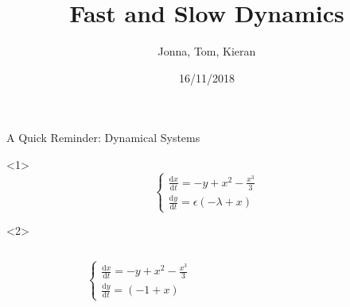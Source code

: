 \documentclass[11pt]{beamer}
\newcommand{\dif}{\mathrm{d}}
\newcommand{\vdp}{Van der Pol }
\begin{document}
  

\author{Jonna, Tom, Kieran}
\title{Fast and Slow Dynamics}
\date{16/11/2018} 
\frame \titlepage
%		


\begin{frame}{ A Quick Reminder: Dynamical Systems}
\begin{onlyenv}<1>
\huge
 \[\begin{cases}
 \frac{\dif x}{\dif t}= -y + x^2 - \frac{x^3}{3}\\
 \frac{\dif y}{\dif t}=\epsilon (-\lambda+x)
 \end{cases}\]%
\end{onlyenv}
\begin{onlyenv}<2>
\begin{columns}
\begin{figure}
    \centering
{}
\end{figure}
\[\begin{cases}
 \frac{\dif x}{\dif t}= -y + x^2 - \frac{x^3}{3}\\
 \frac{\dif y}{\dif t}= (-1+x)
 \end{cases}\]
\end{columns}
\end{onlyenv}
\end{frame} 
\end{document}
